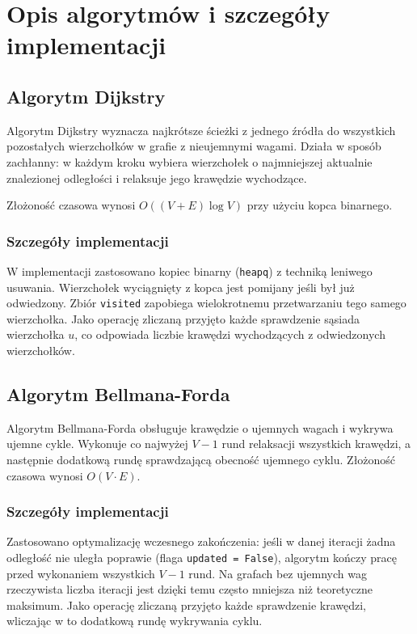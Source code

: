 \documentclass[12pt,a4paper]{article}
\begin{document}
\section{Opis algorytmów i szczegóły implementacji}

\subsection{Algorytm Dijkstry}

Algorytm Dijkstry wyznacza najkrótsze ścieżki z jednego źródła do wszystkich pozostałych wierzchołków w grafie z nieujemnymi wagami. Działa w sposób zachłanny: w każdym kroku wybiera wierzchołek o najmniejszej aktualnie znalezionej odległości i relaksuje jego krawędzie wychodzące.

Złożoność czasowa wynosi $O((V + E) \log V)$ przy użyciu kopca binarnego.

\subsubsection*{Szczegóły implementacji}

W implementacji zastosowano kopiec binarny (\texttt{heapq}) z techniką leniwego usuwania. Wierzchołek wyciągnięty z kopca jest pomijany jeśli był już odwiedzony. Zbiór \texttt{visited} zapobiega wielokrotnemu przetwarzaniu tego samego wierzchołka. Jako operację zliczaną przyjęto każde sprawdzenie sąsiada wierzchołka $u$, co odpowiada liczbie krawędzi wychodzących z odwiedzonych wierzchołków.

\subsection{Algorytm Bellmana-Forda}

Algorytm Bellmana-Forda obsługuje krawędzie o ujemnych wagach i wykrywa ujemne cykle. Wykonuje co najwyżej $V - 1$ rund relaksacji wszystkich krawędzi, a następnie dodatkową rundę sprawdzającą obecność ujemnego cyklu. Złożoność czasowa wynosi $O(V \cdot E)$.

\subsubsection*{Szczegóły implementacji}

Zastosowano optymalizację wczesnego zakończenia: jeśli w danej iteracji żadna odległość nie uległa poprawie (flaga \texttt{updated = False}), algorytm kończy pracę przed wykonaniem wszystkich $V-1$ rund. Na grafach bez ujemnych wag rzeczywista liczba iteracji jest dzięki temu często mniejsza niż teoretyczne maksimum. Jako operację zliczaną przyjęto każde sprawdzenie krawędzi, wliczając w to dodatkową rundę wykrywania cyklu.
\end{document}
